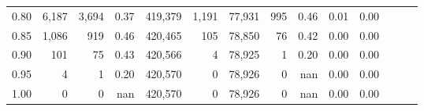 \begin{tabular}{rrrrrrrrrrrrrr}
0.80 &   6,187 &   3,694 &  0.37 &  419,379 &    1,191 &  77,931 &     995 &  0.46 &  0.01 &      0.00 \\
0.85 &   1,086 &     919 &  0.46 &  420,465 &      105 &  78,850 &      76 &  0.42 &  0.00 &      0.00 \\
0.90 &     101 &      75 &  0.43 &  420,566 &        4 &  78,925 &       1 &  0.20 &  0.00 &      0.00 \\
0.95 &       4 &       1 &  0.20 &  420,570 &        0 &  78,926 &       0 &   nan &  0.00 &      0.00 \\
1.00 &       0 &       0 &   nan &  420,570 &        0 &  78,926 &       0 &   nan &  0.00 &      0.00 \\
\bottomrule
\end{tabular}
